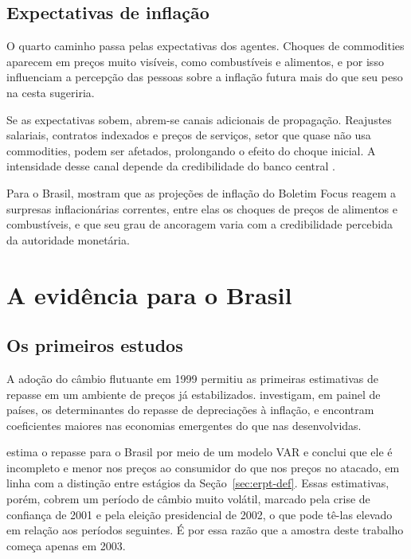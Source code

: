 \documentclass[12pt,openright,oneside,a4paper,portuguese,brazil]{abntex2}
\begin{document}
\subsection{Expectativas de inflação}
\label{sec:expectativas}

O quarto caminho passa pelas expectativas dos agentes. Choques de commodities
aparecem em preços muito visíveis, como combustíveis e alimentos, e por isso
influenciam a percepção das pessoas sobre a inflação futura mais do que seu peso
na cesta sugeriria.

Se as expectativas sobem, abrem-se canais adicionais de propagação. Reajustes
salariais, contratos indexados e preços de serviços, setor que quase não usa
commodities, podem ser afetados, prolongando o efeito do choque inicial. A
intensidade desse canal depende da credibilidade do banco central
\cite{gagnon2004}.

Para o Brasil,  mostram que as projeções de
inflação do Boletim Focus reagem a surpresas inflacionárias correntes, entre
elas os choques de preços de alimentos e combustíveis, e que seu grau de
ancoragem varia com a credibilidade percebida da autoridade monetária.

\section{A evidência para o Brasil}
\label{sec:evidencia}

\subsection{Os primeiros estudos}
\label{sec:pioneiras}

A adoção do câmbio flutuante em 1999 permitiu as primeiras estimativas de
repasse em um ambiente de preços já estabilizados. 
investigam, em painel de países, os determinantes do repasse de depreciações à
inflação, e encontram coeficientes maiores nas economias emergentes do que nas
desenvolvidas.

 estima o repasse para o Brasil por meio de um modelo
VAR e conclui que ele é incompleto e menor nos preços ao consumidor do que nos
preços no atacado, em linha com a distinção entre estágios da
Seção~\ref{sec:erpt-def}. Essas estimativas, porém, cobrem um período
de câmbio muito volátil, marcado pela crise de confiança de 2001 e pela eleição
presidencial de 2002, o que pode tê-las elevado em relação aos períodos
seguintes. É por essa razão que a amostra deste trabalho começa apenas em 2003.
\end{document}

